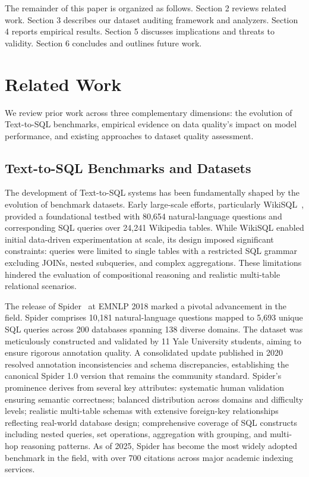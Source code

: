 \documentclass[print]{einformatica}
\begin{document}
The remainder of this paper is organized as follows. Section 2 reviews related work. Section 3 describes our dataset auditing framework and analyzers. Section 4 reports empirical results. Section 5 discusses implications and threats to validity. Section 6 concludes and outlines future work.

\section{Related Work}\label{sec:RelatedWork}

We review prior work across three complementary dimensions: the evolution of Text-to-SQL benchmarks, empirical evidence on data quality's impact on model performance, and existing approaches to dataset quality assessment.

\subsection{Text-to-SQL Benchmarks and Datasets}

The development of Text-to-SQL systems has been fundamentally shaped by the evolution of benchmark datasets. Early large-scale efforts, particularly WikiSQL~\cite{zhong2017seq2sql}, provided a foundational testbed with 80,654 natural-language questions and corresponding SQL queries over 24,241 Wikipedia tables. While WikiSQL enabled initial data-driven experimentation at scale, its design imposed significant constraints: queries were limited to single tables with a restricted SQL grammar excluding JOINs, nested subqueries, and complex aggregations. These limitations hindered the evaluation of compositional reasoning and realistic multi-table relational scenarios.

The release of Spider~\cite{yu2018spider} at EMNLP 2018 marked a pivotal advancement in the field. Spider comprises 10,181 natural-language questions mapped to 5,693 unique SQL queries across 200 databases spanning 138 diverse domains. The dataset was meticulously constructed and validated by 11 Yale University students, aiming to ensure rigorous annotation quality. A consolidated update published in 2020 resolved annotation inconsistencies and schema discrepancies, establishing the canonical Spider 1.0 version that remains the community standard. Spider's prominence derives from several key attributes: systematic human validation ensuring semantic correctness; balanced distribution across domains and difficulty levels; realistic multi-table schemas with extensive foreign-key relationships reflecting real-world database design; comprehensive coverage of SQL constructs including nested queries, set operations, aggregation with grouping, and multi-hop reasoning patterns. As of 2025, Spider has become the most widely adopted benchmark in the field, with over 700 citations across major academic indexing services.
\end{document}

